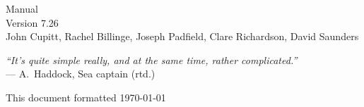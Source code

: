 \documentclass[a4paper,twocolumn,dvips]{book}
\begin{document}

\begin{titlepage}
\thispagestyle{empty}
\begin{center}
\huge
\nip{} Manual\\[0.2em]
\large Version 7.26\\
\vspace{0.5in}
\large
John Cupitt, 
Rachel Billinge,
Joseph Padfield, 
Clare Richardson, 
David Saunders\\ 
\end{center}

\vspace{3in}

\begin{center}
\noindent
\emph{``It's quite simple really, and at the same time, rather 
complicated.''} \\
--- A.\ Haddock, Sea captain (rtd.)
\end{center}

\vspace{3in}

\noindent
\small{This document formatted \today}
\setcounter{page}{1}
\end{titlepage}

\tableofcontents
\thispagestyle{plain}

\listoffigures
\thispagestyle{plain}

\listoftables
\thispagestyle{plain}

\blankpage
{}
\thispagestyle{plain}
\cfoot{}







\appendix

\end{document}
